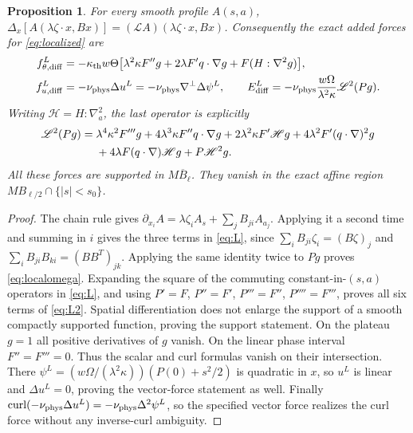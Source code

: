 \documentclass[11pt]{article}
\newtheorem{proposition}{Proposition}
\newcommand{\thd}{\kappa_{\rm th}}
\newcommand{\vis}{\nu_{\rm phys}}
\begin{document}
\begin{proposition}\label{prop:localized}
For every smooth profile $A(s,a)$,
$\Delta_x[A(\lambda\zeta\cdot x,Bx)]=
(\mathscr L A)(\lambda\zeta\cdot x,Bx)$.
Consequently the exact added forces for \eqref{eq:localized} are
\begin{align}
 f^L_{\theta,\mathrm{diff}}
 &=-\thd w\Theta\big[
 \lambda^2\kappa F''g+2\lambda F' q\cdot\nabla g
                         +F(H:\nabla^2g)\big],\label{eq:localtheta}\\
 f^L_{u,\mathrm{diff}}&=-\vis\Delta u^L
 =-\vis\nabla^\perp\Delta\psi^L,
 \qquad
 E^L_{\mathrm{diff}}=-\vis\frac{w\Omega}{\lambda^2\kappa}
       \mathscr L^2(Pg).\label{eq:localomega}
\end{align}
Writing $\mathscr H=H:\nabla_a^2$, the last operator is explicitly
\begin{align}\label{eq:L2}
 \mathscr L^2(Pg)={}&
 \lambda^4\kappa^2 F'''g
 +4\lambda^3\kappa F''q\cdot\nabla g
 +2\lambda^2\kappa F'\mathscr H g
 +4\lambda^2F'(q\cdot\nabla)^2g\notag\\
 &+4\lambda F(q\cdot\nabla)\mathscr H g
 +P\mathscr H^2g.
\end{align}
All these forces are supported in $M\overline B_\ell$. They vanish in
the exact affine region $M B_{\ell/2}\cap\{|s|<s_0\}$.
\end{proposition}
\begin{proof}
The chain rule gives
$\partial_{x_i}A=\lambda\zeta_i A_s+
\sum_jB_{ji}A_{a_j}$. Applying it a second time and summing in $i$
gives the three terms in \eqref{eq:L}, since
$\sum_i B_{ji}\zeta_i=(B\zeta)_j$ and
$\sum_iB_{ji}B_{ki}=(BB^T)_{jk}$. Applying the same identity twice to
$Pg$ proves \eqref{eq:localomega}. Expanding the square of the
commuting constant-in-$(s,a)$ operators in \eqref{eq:L}, and using
$P'=F$, $P''=F'$, $P'''=F''$, $P''''=F'''$, proves all six terms
of \eqref{eq:L2}.
Spatial differentiation does not enlarge the support of a smooth
compactly supported function, proving the support statement.
On the plateau $g=1$ all positive derivatives of $g$ vanish.
On the linear phase interval $F''=F'''=0$. Thus the scalar and curl
formulas vanish on their intersection. There
$\psi^L=(w\Omega/(\lambda^2\kappa))(P(0)+s^2/2)$ is quadratic in $x$,
so $u^L$ is linear and $\Delta u^L=0$, proving the vector-force statement
as well. Finally $\operatorname{curl}(-\vis\Delta u^L)
=-\vis\Delta^2\psi^L$, so the specified vector force realizes the
curl force without any inverse-curl ambiguity.
\end{proof}
\end{document}
